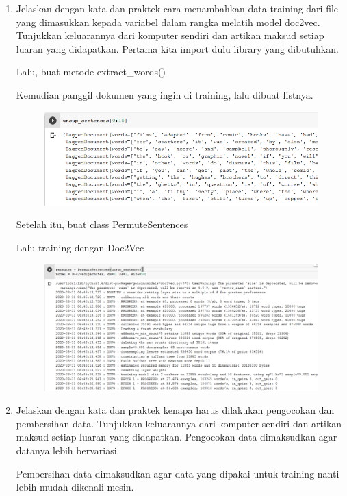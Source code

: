 \begin{enumerate}
	\item Jelaskan dengan kata dan praktek cara menambahkan data training dari file yang dimasukkan kepada variabel dalam rangka melatih model doc2vec. Tunjukkan keluarannya dari komputer sendiri dan artikan maksud setiap luaran yang didapatkan.
	\hfill\break
	Pertama kita import dulu library yang dibutuhkan.
	
	\hfill\break
	Lalu, buat metode extract\_words()
	
	\hfill\break
	Kemudian panggil dokumen yang ingin di training, lalu dibuat listnya.
	
	\hfill\break
	\begin{figure}[H]
	\centering
		\includegraphics[width=8 cm]{figures/1174006/chapter5/soalpraktek/tagged2.PNG}
	\end{figure}
	\hfill\break
	Setelah itu, buat class PermuteSentences
	
	\hfill\break
	Lalu training dengan Doc2Vec
	
	\hfill\break
	\begin{figure}[H]
	\centering
		\includegraphics[width=8 cm]{figures/1174006/chapter5/soalpraktek/doc4vec2.PNG}
	\end{figure}

	\item Jelaskan dengan kata dan praktek kenapa harus dilakukan pengocokan dan pembersihan data. Tunjukkan keluarannya dari komputer sendiri dan artikan maksud setiap luaran yang didapatkan.
	\hfill\break
	Pengocokan data dimaksudkan agar datanya lebih bervariasi.
	
	Pembersihan data dimaksudkan agar data yang dipakai untuk training nanti lebih mudah dikenali mesin.
	
	

\end{enumerate}
